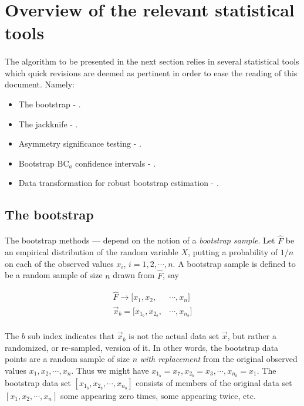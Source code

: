 \documentclass[letterpaper]{article}
\begin{document}
\section*{Overview of the relevant statistical tools}
\paragraph{}
The algorithm to be presented in the next section relies in several statistical tools which quick revisions are deemed as pertinent in order to ease the reading of this document. Namely:

\begin{itemize}
    \item The bootstrap - \cite{efron1979bootstrap}.
    \item The jackknife - \cite{quenouille1949approximate}.
    \item Asymmetry significance testing - \cite{tabachnick2000using}.
    \item Bootstrap $\mathrm{BC}_a$ confidence intervals - \cite{efron1994introduction}.
    \item Data transformation for robust bootstrap estimation - \cite{singh1998breakdown}.
\end{itemize}

\FloatBarrier

\subsection*{The bootstrap}
\paragraph{}
The bootstrap methods --\cite{efron1979bootstrap}-- depend on the notion of a \textit{bootstrap sample}. Let $\hat{F}$ be an empirical distribution of the random variable $X$, putting a probability of $1/n$ on each of the observed values $x_i$, $i=1,2,\cdots,n$. A bootstrap sample is defined to be a random sample of size $n$ drawn from $\hat{F}$, say 

\begin{align}
    \hat{F}\rightarrow[x_1,x_2,&\cdots,x_n] \\
    \vec{x}_b=[x_{1_b},x_{2_b},&\cdots,x_{n_b}]
\end{align}

\paragraph{}
The $b$ sub index indicates that $\vec{x}_b$ is not the actual data set $\vec{x}$, but rather a randomized, or re-sampled, version of it. In other words, the bootstrap data points are a random sample of size $n$ \textit{with replacement} from the original observed values $x_1,x_2,\cdots,x_n$. Thus we might have $x_{1_b}=x_7,x_{2_b}=x_3,\cdots,x_{n_b}=x_1$. The bootstrap data set $[x_{1_b},x_{2_b},\cdots,x_{n_b}]$ consists of members of the original data set $[x_1,x_2,\cdots,x_n]$ some appearing zero times, some appearing twice, etc.
\end{document}
